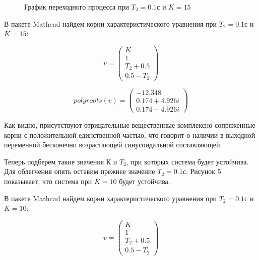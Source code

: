 \documentclass[a4paper, 11pt]{article}
\begin{document}
\begin{figure}[h!]
\caption{График переходного процесса при $T_2=0.1 с$ и $K=15$}
\label{ris:image}
\end{figure}

\par 
	В пакете Mathcad найдем корни характеристического уравнения при $T_2=0.1 с$ и $K=15$:

\begin{equation}
v=\left(
\begin{matrix}
K \\
1 \\
T_2+0.5 \\
0.5-T_2
\end{matrix}
\right)
\end{equation}

\begin{equation}
polyroots(v)=\left(
\begin{matrix}
-12.348 \\
0.174+4.926i \\
0.174-4.926i 
\end{matrix}
\right)
\end{equation}

\par 
	Как видно, присутствуют отрицательные вещественные комплексно-сопряженные корни с положительной единственной частью, что говорит о наличии в выходной переменной бесконечно возрастающей синусоидальной составляющей.
\par 
	Теперь подберем такие значения $К$ и $T_2$, при которых система будет устойчива. Для облегчения опять оставим прежнее значение $T_2=0.1 с$. Рисунок 5 показывает, что система при $K = 10$ будет устойчива.
\par 
	В пакете Mathcad найдем корни характеристического уравнения при $T_2=0.1 с$ и $K=10$:
\par 
\begin{equation}
v=\left(
\begin{matrix}
K \\
1 \\
T_2+0.5 \\
0.5-T_2
\end{matrix}
\right)
\end{equation}
\end{document}
